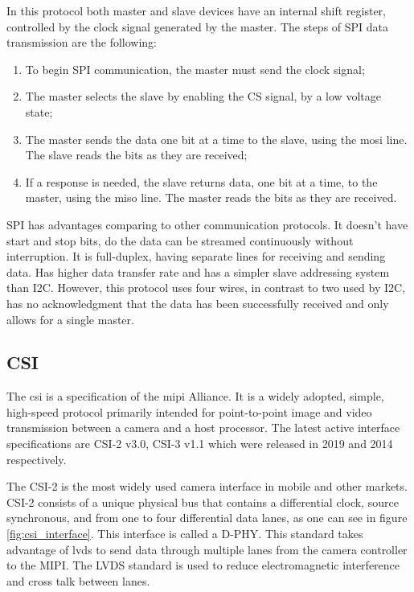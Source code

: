 
In this protocol both master and slave devices have an internal shift register, controlled by the clock signal generated by the master.
\clearpage
The steps of SPI data transmission are the following:

\begin{enumerate}
	\item To begin SPI communication, the master must send the clock signal;
	\item The master selects the slave by enabling the CS signal, by a low voltage state;
	\item The master sends the data one bit at a time to the slave, using the \ac{mosi} line. The slave reads the bits as they are received;
	\item If a response is needed, the slave returns data, one bit at a time, to the master, using the \ac{miso} line. The master reads the bits as they are received.
\end{enumerate}

SPI has advantages comparing to other communication protocols. It doesn't have start and stop bits, do the data can be streamed continuously without interruption. It is full-duplex, having separate lines for receiving and sending data. Has higher data transfer rate and has a simpler slave addressing system than I2C. However, this protocol uses four wires, in contrast to two used by I2C, has no acknowledgment that the data has been successfully received and only allows for a single master. \cite{spi_basics}

\clearpage
\subsection{CSI}
The \ac{csi} is a specification of the \ac{mipi} Alliance. It is a widely adopted, simple, high-speed protocol primarily intended for point-to-point image and video transmission between a camera and a host processor. The latest active interface specifications are CSI-2 v3.0, CSI-3 v1.1 which were released in 2019 and 2014 respectively. \cite{csi_basics}

The CSI-2 is the most widely used camera interface in mobile and other markets. CSI-2 consists of a unique physical bus that contains a differential clock, source synchronous, and from one to four differential data lanes, as one can see in figure \ref{fig:csi_interface}. This interface is called a D-PHY. This standard takes advantage of \ac{lvds} to send data through multiple lanes from the camera controller to the MIPI. The LVDS standard is used to reduce electromagnetic interference and cross talk between lanes.

